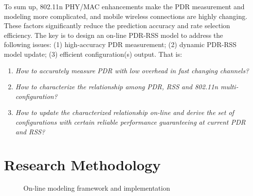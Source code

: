 \documentclass[draftclsnofoot,journal,onecolumn,11pt]{IEEEtran}
\begin{document}
To sum up, 802.11n PHY/MAC enhancements make the PDR measurement and modeling more complicated, and mobile wireless connections are highly changing. These factors significantly reduce the prediction accuracy and rate selection efficiency. The key is to design an on-line PDR-RSS model to address the following issues: (1) high-accuracy PDR measurement; (2) dynamic PDR-RSS model update; (3) efficient configuration(s) output. That is:
\begin{enumerate}
  \item \textit{How to accurately measure PDR with low overhead in fast changing channels?}
  \item \textit{How to characterize the relationship among PDR, RSS and 802.11n multi-configuration?}
  \item \textit{How to update the characterized relationship on-line and derive the set of configurations with certain reliable performance guaranteeing at current PDR and RSS?}
\end{enumerate}



\section{Research Methodology}

\begin{figure}[!t]
\centerline{
}
\caption{On-line modeling framework and implementation}
\label{implamentation}
\end{figure}
\end{document}
